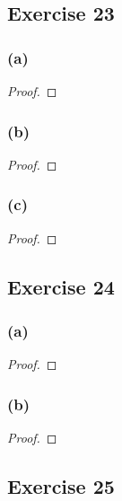 \documentclass[14pt]{extarticle}
\begin{document}
\subsection{Exercise 23}

\subsubsection{(a)}

\begin{proof}

\end{proof}

\subsubsection{(b)}

\begin{proof}

\end{proof}

\subsubsection{(c)}

\begin{proof}

\end{proof}

\subsection{Exercise 24}

\subsubsection{(a)}

\begin{proof}

\end{proof}

\subsubsection{(b)}

\begin{proof}

\end{proof}

\subsection{Exercise 25}
\end{document}
